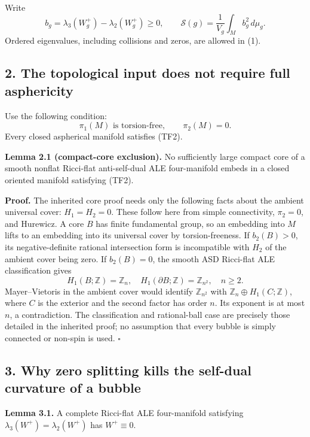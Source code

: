 \documentclass[
  11pt,
]{article}
\begin{document}
Write \[
 b_g=\lambda_3(W_g^+)-\lambda_2(W_g^+)\ge0,
 \qquad \mathscr S(g)=\frac1{V_g}\int_M b_g^2\,d\mu_g.       \tag{1}
\] Ordered eigenvalues, including collisions and zeros, are allowed in
(1).

\hypertarget{the-topological-input-does-not-require-full-asphericity}{%
\subsection{2. The topological input does not require full
asphericity}\label{the-topological-input-does-not-require-full-asphericity}}

Use the following condition: \[
 \pi_1(M)\text{ is torsion-free},\qquad \pi_2(M)=0.           \tag{TF2}
\] Every closed aspherical manifold satisfies (TF2).

\textbf{Lemma 2.1 (compact-core exclusion).} No sufficiently large
compact core of a smooth nonflat Ricci-flat anti-self-dual ALE
four-manifold embeds in a closed oriented manifold satisfying (TF2).

\textbf{Proof.} The inherited core proof needs only the following facts
about the ambient universal cover: \(H_1=H_2=0\). These follow here from
simple connectivity, \(\pi_2=0\), and Hurewicz. A core \(B\) has finite
fundamental group, so an embedding into \(M\) lifts to an embedding into
its universal cover by torsion-freeness. If \(b_2(B)>0\), its
negative-definite rational intersection form is incompatible with
\(H_2\) of the ambient cover being zero. If \(b_2(B)=0\), the smooth ASD
Ricci-flat ALE classification gives \[
 H_1(B;\mathbb Z)=\mathbb Z_n,\quad
 H_1(\partial B;\mathbb Z)=\mathbb Z_{n^2},\quad n\ge2.
\] Mayer--Vietoris in the ambient cover would identify
\(\mathbb Z_{n^2}\) with \(\mathbb Z_n\oplus H_1(C;\mathbb Z)\), where
\(C\) is the exterior and the second factor has order \(n\). Its
exponent is at most \(n\), a contradiction. The classification and
rational-ball case are precisely those detailed in the inherited proof;
no assumption that every bubble is simply connected or non-spin is used.
\(\square\)

\hypertarget{why-zero-splitting-kills-the-self-dual-curvature-of-a-bubble}{%
\subsection{3. Why zero splitting kills the self-dual curvature of a
bubble}\label{why-zero-splitting-kills-the-self-dual-curvature-of-a-bubble}}

\textbf{Lemma 3.1.} A complete Ricci-flat ALE four-manifold satisfying
\(\lambda_3(W^+)=\lambda_2(W^+)\) has \(W^+\equiv0\).
\end{document}
